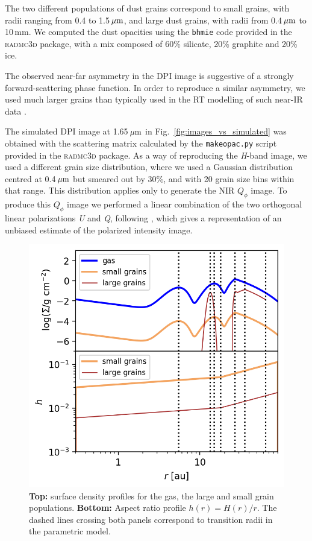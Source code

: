 \documentclass[letters,usenatbib,times]{mnras}
\begin{document}
The two different populations of dust grains correspond to small grains, with radii ranging from 0.4 to 1.5\,$\hbox{$\mu$m}$, and large dust grains, with radii from 0.4\,$\hbox{$\mu$m}$ to 10\,mm. We computed the dust opacities using the {\tt bhmie} code provided in the \textsc{radmc3d} package, with a mix composed of 60\% silicate, 20\% graphite and 20\% ice. 

The observed near-far asymmetry in the DPI image is suggestive of a strongly forward-scattering phase function. In order to reproduce a similar asymmetry, we used much larger grains than typically used in the RT modelling of such near-IR data \citep[e.g.,][]{2018MNRAS.477.5104C}. 

The simulated DPI image at 1.65\,$\hbox{$\mu$m}$ in Fig.~\ref{fig:images_vs_simulated} was obtained with the scattering matrix calculated by the {\tt makeopac.py} script provided in the \textsc{radmc3d} package. As a way of reproducing the \textit{H}-band image, we used a different grain size distribution, where we used a Gaussian distribution centred at 0.4\,$\hbox{$\mu$m}$ but  smeared out by 30\%, and with 20 grain size bins within that range. This distribution applies only to generate the NIR $Q_\phi$ image. To produce this $Q_\phi$ image we performed a linear combination of the two orthogonal linear polarizations \textit{U} and \textit{Q}, following \citet{Avenhaus_2017}, which gives a representation of an unbiased estimate of the polarized intensity image.

\begin{figure}
	\includegraphics[width=\columnwidth]{allprofiles.png}
        \caption{{\bf Top:} surface density profiles for the gas, the large and small grain populations. {\bf Bottom:} Aspect ratio profile $h(r)= H(r)/r$. The dashed lines crossing both panels correspond to transition radii in the parametric model.}
    \label{fig:profiles}
\end{figure}
\end{document}

